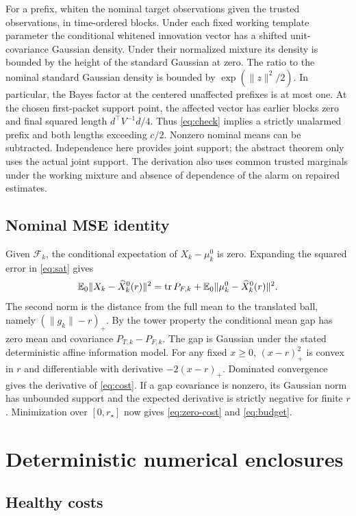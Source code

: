 For a prefix, whiten the nominal target observations given the trusted observations, in time-ordered blocks. Under each fixed working template parameter the conditional whitened innovation vector has a shifted unit-covariance Gaussian density. Under their normalized mixture its density is bounded by the height of the standard Gaussian at zero. The ratio to the nominal standard Gaussian density is bounded by \(\exp(\|z\|^2/2)\). In particular, the Bayes factor at the centered unaffected prefixes is at most one. At the chosen first-packet support point, the affected vector has earlier blocks zero and final squared length \(d^\top V^{-1}d/4\). Thus \eqref{eq:check} implies a strictly unalarmed prefix and both lengths exceeding \(c/2\). Nonzero nominal means can be subtracted. Independence here provides joint support; the abstract theorem only uses the actual joint support. The derivation also uses common trusted marginals under the working mixture and absence of dependence of the alarm on repaired estimates.

\subsection{Nominal MSE identity}

Given \(\mathcal F_k\), the conditional expectation of \(X_k-\mu_k^0\) is zero. Expanding the squared error in \eqref{eq:sat} gives
\[
 \mathbb{E}_0\|X_k-\widehat X_k^0(r)\|^2
 =\operatorname{tr} P_{F,k}+\mathbb{E}_0\|\mu_k^0-\widehat X_k^0(r)\|^2 .
\]
The second norm is the distance from the full mean to the translated ball, namely \((\|g_k\|-r)_+\). By the tower property the conditional mean gap has zero mean and covariance \(P_{T,k}-P_{F,k}\). The gap is Gaussian under the stated deterministic affine information model. For any fixed \(x\ge0\), \((x-r)_+^2\) is convex in \(r\) and differentiable with derivative \(-2(x-r)_+\). Dominated convergence gives the derivative of \eqref{eq:cost}. If a gap covariance is nonzero, its Gaussian norm has unbounded support and the expected derivative is strictly negative for finite \(r\). Minimization over \([0,r_\star]\) now gives \eqref{eq:zero-cost} and \eqref{eq:budget}.

\section{Deterministic numerical enclosures}
\label{app:cert}

\subsection{Healthy costs}

